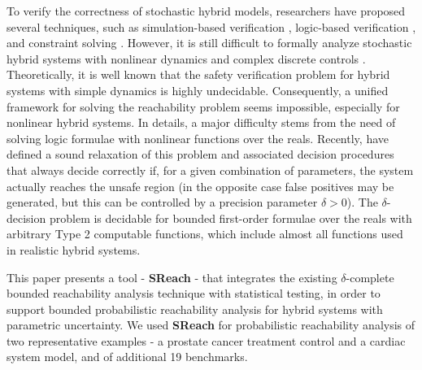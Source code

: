 To verify the correctness of stochastic hybrid models, researchers have proposed several techniques, such as simulation-based verification \cite{zuliani2010bayesian, abate2007probabilistic}, logic-based verification \cite{platzer2011stochastic}, and constraint solving \cite{franzle2008stochastic}. However, it is still difficult to formally analyze stochastic hybrid systems with nonlinear dynamics and complex discrete controls \cite{alur2011formal, henzinger2000theory}. Theoretically, it is well known that the safety verification problem for hybrid systems with simple dynamics is highly undecidable. Consequently, a unified framework for solving the reachability problem seems impossible, especially for nonlinear hybrid systems. In details, a major difficulty stems from the need of solving logic formulae with nonlinear functions over the reals. Recently, \cite{gao2013dreal, gao2013satisfiability} 
have defined a sound relaxation of this problem and associated decision procedures that always decide correctly 
if, for a given combination of parameters, the system actually reaches the unsafe region (in the opposite case
false positives may be generated, but this can be controlled by a precision parameter $\delta>0$).
The $\delta$-decision problem is decidable for bounded first-order formulae over the reals with arbitrary 
Type 2 computable functions, which include almost all functions used in realistic hybrid systems.   

This paper presents a tool - {\bf SReach} - that integrates the existing $\delta$-complete bounded 
reachability analysis technique \cite{gaodelta} with statistical testing, in order
to support bounded probabilistic reachability analysis for hybrid systems with parametric uncertainty. 
We used {\bf SReach} for probabilistic reachability analysis of two representative examples - a prostate cancer 
treatment control and a cardiac system model, and of additional 19 benchmarks.
